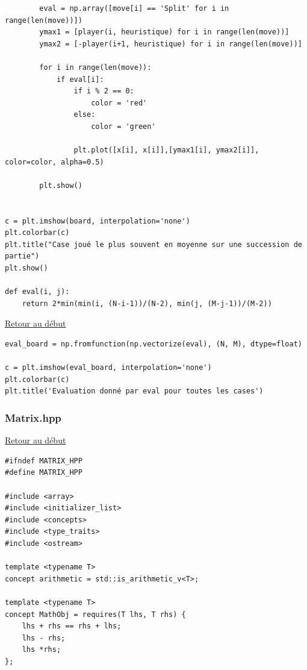 {\begin{frame}[fragile]
\begin{verbatim}
        eval = np.array([move[i] == 'Split' for i in range(len(move))])
        ymax1 = [player(i, heuristique) for i in range(len(move))]
        ymax2 = [-player(i+1, heuristique) for i in range(len(move))]

        for i in range(len(move)):
            if eval[i]:
                if i % 2 == 0:
                    color = 'red'
                else:
                    color = 'green'
                
                plt.plot([x[i], x[i]],[ymax1[i], ymax2[i]], color=color, alpha=0.5)

        plt.show()


c = plt.imshow(board, interpolation='none')
plt.colorbar(c)
plt.title("Case joué le plus souvent en moyenne sur une succession de partie")
plt.show()

def eval(i, j):
    return 2*min(min(i, (N-i-1))/(N-2), min(j, (M-j-1))/(M-2))

\end{verbatim}
\end{frame}

\begin{frame}[fragile]
\hyperlink{conclusion}{Retour au début}\newline
\begin{verbatim}
eval_board = np.fromfunction(np.vectorize(eval), (N, M), dtype=float)

c = plt.imshow(eval_board, interpolation='none')
plt.colorbar(c)
plt.title('Evaluation donné par eval pour toutes les cases')

\end{verbatim}
\end{frame}

\begin{frame}[fragile]
\label{Matrix.hpp}
\frametitle{Matrix.hpp}
\hyperlink{conclusion}{Retour au début}\newline
\begin{verbatim}
#ifndef MATRIX_HPP
#define MATRIX_HPP

#include <array>
#include <initializer_list>
#include <concepts>
#include <type_traits>
#include <ostream>

template <typename T>
concept arithmetic = std::is_arithmetic_v<T>;

template <typename T>
concept MathObj = requires(T lhs, T rhs) {
	lhs + rhs == rhs + lhs;
	lhs - rhs;
	lhs *rhs;
};


\end{verbatim}
\end{frame}}
